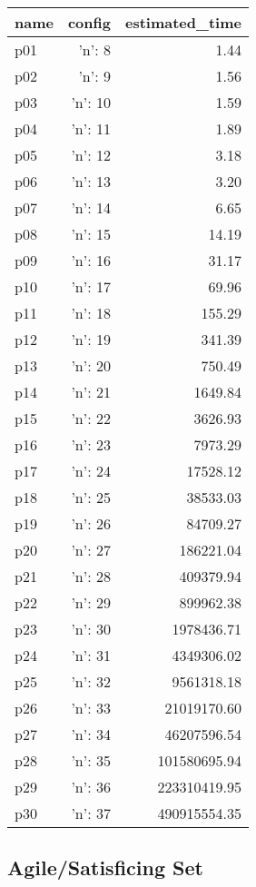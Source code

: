 \documentclass{article}
\begin{document}
                            \begin{center}
                            \scriptsize
                            \begin{tabular}{@{}l|r|r@{}}
                            name & config & estimated\_time\\\midrule
                              p01&{'n': 8}&1.44\\
  p02&{'n': 9}&1.56\\
  p03&{'n': 10}&1.59\\
  p04&{'n': 11}&1.89\\
  p05&{'n': 12}&3.18\\
  p06&{'n': 13}&3.20\\
  p07&{'n': 14}&6.65\\
  p08&{'n': 15}&14.19\\
  p09&{'n': 16}&31.17\\
  p10&{'n': 17}&69.96\\
  p11&{'n': 18}&155.29\\
  p12&{'n': 19}&341.39\\
  p13&{'n': 20}&750.49\\
  p14&{'n': 21}&1649.84\\
  p15&{'n': 22}&3626.93\\
  p16&{'n': 23}&7973.29\\
  p17&{'n': 24}&17528.12\\
  p18&{'n': 25}&38533.03\\
  p19&{'n': 26}&84709.27\\
  p20&{'n': 27}&186221.04\\
  p21&{'n': 28}&409379.94\\
  p22&{'n': 29}&899962.38\\
  p23&{'n': 30}&1978436.71\\
  p24&{'n': 31}&4349306.02\\
  p25&{'n': 32}&9561318.18\\
  p26&{'n': 33}&21019170.60\\
  p27&{'n': 34}&46207596.54\\
  p28&{'n': 35}&101580695.94\\
  p29&{'n': 36}&223310419.95\\
  p30&{'n': 37}&490915554.35
                            \end{tabular}
                            \end{center}
                    

                                \subsection*{Agile/Satisficing Set}
                                
\end{document}
